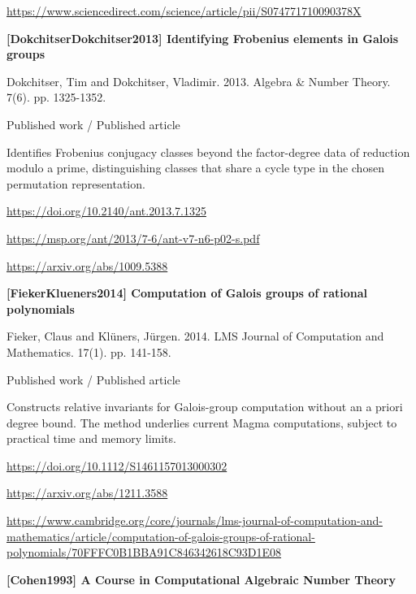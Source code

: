 \documentclass[11pt,a4paper,oneside,openany]{book}
\begin{document}
{\footnotesize\url{https://www.sciencedirect.com/science/article/pii/S074771710090378X}}\par
\vspace{9pt}
\hypertarget{ref:DokchitserDokchitser2013}{}
{\sffamily\bfseries\color{atlasgreen}[DokchitserDokchitser2013] Identifying Frobenius elements in Galois groups}\par
\color{black} Dokchitser, Tim and Dokchitser, Vladimir. 2013. Algebra \& Number Theory. 7(6). pp. 1325-1352.\par
{\small\sffamily\color{atlasgold}Published work / Published article}\par
\color{black} Identifies Frobenius conjugacy classes beyond the factor-degree data of reduction modulo a prime, distinguishing classes that share a cycle type in the chosen permutation representation.\par
{\footnotesize\url{https://doi.org/10.2140/ant.2013.7.1325}}\par
{\footnotesize\url{https://msp.org/ant/2013/7-6/ant-v7-n6-p02-s.pdf}}\par
{\footnotesize\url{https://arxiv.org/abs/1009.5388}}\par
\vspace{9pt}
\hypertarget{ref:FiekerKlueners2014}{}
{\sffamily\bfseries\color{atlasgreen}[FiekerKlueners2014] Computation of Galois groups of rational polynomials}\par
\color{black} Fieker, Claus and Klüners, Jürgen. 2014. LMS Journal of Computation and Mathematics. 17(1). pp. 141-158.\par
{\small\sffamily\color{atlasgold}Published work / Published article}\par
\color{black} Constructs relative invariants for Galois-group computation without an a priori degree bound. The method underlies current Magma computations, subject to practical time and memory limits.\par
{\footnotesize\url{https://doi.org/10.1112/S1461157013000302}}\par
{\footnotesize\url{https://arxiv.org/abs/1211.3588}}\par
{\footnotesize\url{https://www.cambridge.org/core/journals/lms-journal-of-computation-and-mathematics/article/computation-of-galois-groups-of-rational-polynomials/70FFFC0B1BBA91C846342618C93D1E08}}\par
\vspace{9pt}
\hypertarget{ref:Cohen1993}{}
{\sffamily\bfseries\color{atlasgreen}[Cohen1993] A Course in Computational Algebraic Number Theory}\par
\end{document}
